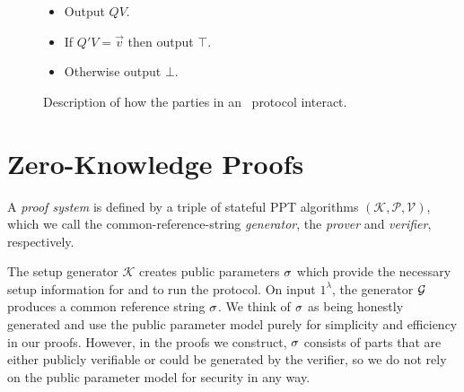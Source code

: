 \begin{figure}[!h]
{\begin{minipage}[t]{6.5cm}
\begin{algorithm}[H]
\caption*{\ILCopen($Q$)}
\begin{itemize}
\item Output $QV$.
\end{itemize}
\end{algorithm}
\vspace{-1.07cm}
\begin{algorithm}[H]
\caption*{\ILCcheck($Q', \vec{v}$)}
\begin{itemize}
\item If $Q'V = \vec{v}$ then output $\top$.
\item Otherwise output $\bot$.
\end{itemize}
\end{algorithm}
\end{minipage}
}
\caption{Description of how the parties in an \ILC\ protocol interact.}
\label{fig:ILCpseudocode}
\end{figure}

\section{Zero-Knowledge Proofs}
\label{shvzkdef}

A \emph{proof system} is defined by a triple of stateful PPT algorithms $(\mathcal{K},\mathcal{P},\mathcal{V})$, which we call the common-reference-string \emph{generator}, the \emph{prover} and \emph{verifier}, respectively.

The setup generator $\mathcal{K}$ creates public parameters $\mathsf{\sigma}$ which provide the necessary setup information for \prover and \verifier to run the protocol. On input $1^\lambda$, the generator $\mathcal{G}$ produces a common reference string $\mathsf{\sigma}$. We think of $\mathsf{\sigma}$ as being honestly generated and use the public parameter model purely for simplicity and efficiency in our proofs. However, in the proofs we construct, $\mathsf{\sigma}$ consists of parts that are either publicly verifiable or could be generated by the verifier, so we do not rely on the public parameter model for security in any way.

